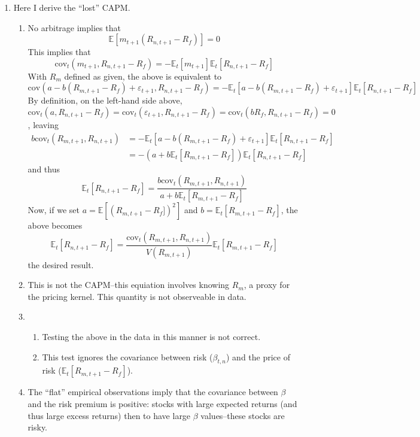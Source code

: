 \documentclass[11pt]{article}
\newcommand{\ev}{\mathbb{E}}
\begin{document}
\begin{enumerate}
	\item Here I derive the ``lost'' CAPM.
	\begin{enumerate}
		\item No arbitrage implies that 
		\[\ev[m_{t+1}(R_{n,t+1} - R_f)] = 0\]
		This implies that 
		\[\text{cov}_t(m_{t+1}, R_{n,t+1} - R_f) = -\ev_t[m_{t+1}]\ev_t[R_{n,t+1} - R_f]\]
		With \(R_m\) defined as given, the above is equivalent to 
		\[\text{cov}(a - b(R_{m,t+1} - R_f) + \varepsilon_{t+1}, R_{n,t+1} - R_f) = -\ev_t[a - b(R_{m,t+1} - R_f) + \varepsilon_{t+1}]\ev_t[R_{n,t+1} - R_f]\]
		By definition, on the left-hand side above, 
		\[\text{cov}_t(a, R_{n,t+1} - R_f) = \text{cov}_t(\varepsilon_{t+1}, R_{n,t+1} - R_f) = \text{cov}_t(bR_f, R_{n,t+1} - R_f) = 0\], leaving
		\begin{align*}
			b\text{cov}_t(R_{m,t+1},R_{n,t+1}) &= -\ev_t[a - b(R_{m,t+1} - R_f) + \varepsilon_{t+1}]\ev_t[R_{n,t+1} - R_f] \\
			&= -(a + b\ev_t[R_{m,t+1} - R_f])\ev_t[R_{n,t+1} - R_f]
		\end{align*}
		and thus
		\[\ev_t[R_{n,t+1} - R_f] = \frac{b\text{cov}_t(R_{m,t+1},R_{n,t+1})}{a + b\ev_t[R_{m,t+1} - R_f]}\]
		Now, if we set \(a = \ev[(R_{m,t+1} - R_f])^2]\) and \(b = \ev_t[R_{m,t+1} - R_f]\), the above becomes
		\[\ev_t[R_{n,t+1} - R_f] = \frac{\text{cov}_t(R_{m,t+1},R_{n,t+1})}{V(R_{m,t+1})}\ev_t[R_{m,t+1} - R_f]\]
		the desired result.
		\item This is not the CAPM--this equiation involves knowing \(R_m\), a proxy for the pricing kernel. This quantity is not observeable in data. 
		\item \begin{enumerate}[label = (\roman*)]
			\item Testing the above in the data in this manner is not correct.
			\item This test ignores the covariance between risk (\(\beta_{t,n}\)) and the price of risk (\(\ev_t[R_{m,t+1} - R_f]\)). 
		\end{enumerate}
		\item The ``flat'' empirical observations imply that the covariance between \(\beta\) and the risk premium is positive: stocks with large expected returns (and thus large excess returns) then to have large \(\beta\) values--these stocks are risky. 
	\end{enumerate}
\end{enumerate}
\end{document}
